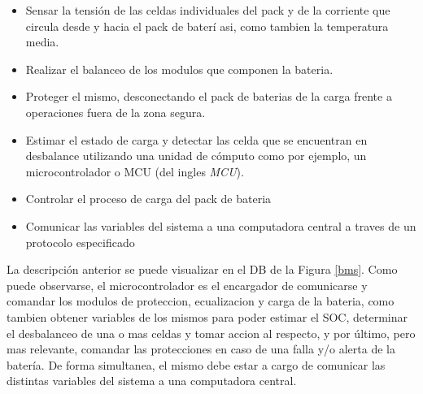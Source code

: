 \documentclass[10pt,a4paper]{article}
\begin{document}
	\begin{itemize}
		\item Sensar la tensión de las celdas individuales del pack y de la 
        corriente que circula desde y hacia el pack de baterí asi, como tambien 
        la temperatura media.
		\item Realizar el balanceo de los modulos que componen la bateria.
		\item Proteger el mismo, desconectando el pack de baterias de la carga
            frente a operaciones fuera de la zona segura.
		\item Estimar el estado de carga y detectar las celda que se encuentran
            en desbalance utilizando una unidad de cómputo como por ejemplo, un
            microcontrolador o \acrshort{MCU} (del ingles \emph{\acrlong{MCU}}).
        \item Controlar el proceso de carga del pack de bateria
        \item Comunicar las variables del sistema a una computadora central a
        traves de un protocolo especificado
	\end{itemize}
	
	\noindent La descripción anterior se puede visualizar en el \acrfull{DB} de la Figura \ref{bms}. Como puede observarse, 
    el microcontrolador es el encargador de comunicarse y comandar los modulos 
    de proteccion, ecualizacion y carga de la bateria, como tambien obtener 
    variables de los mismos para poder estimar el \acrshort{SOC}, determinar el 
    desbalanceo de una o mas celdas y tomar accion al respecto, y por último, 
    pero mas relevante, comandar las protecciones en caso de una falla y/o 
    alerta de la batería. De forma simultanea, el mismo debe estar a cargo de 
    comunicar las distintas variables del sistema a una computadora central.

    \clearpage
\end{document}
